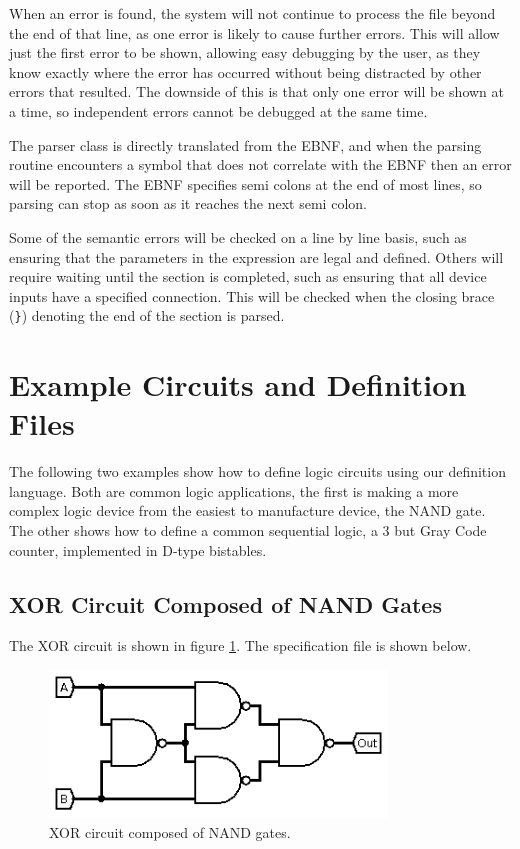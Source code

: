 \documentclass[a4paper,11pt]{article}  %
\begin{document}
When an error is found, the system will not continue to process the
file beyond the end of that line, as one error is likely to cause
further errors. This will allow just the first error to be shown,
allowing easy debugging by the user, as they know exactly where the
error has occurred without being distracted by other errors that
resulted. The downside of this is that only one error will be shown at
a time, so independent errors cannot be debugged at the same time. 

The parser class is directly translated from the EBNF, and when the
parsing routine encounters a symbol that does not correlate with the
EBNF then an error will be reported. The EBNF specifies
semi colons at the end of most lines, so parsing can stop as soon as
it reaches the next semi colon.

Some of the semantic errors will be checked on a line by line basis,
such as ensuring that the parameters in the expression are legal and
defined. Others will require waiting until the section is completed,
such as ensuring that all device inputs have a specified
connection. This will be checked when the closing brace (\verb+}+)
denoting the end of the section is parsed.

\section{Example Circuits and Definition Files}

The following two examples show how to define logic circuits using our
definition language. Both are common logic applications, the first is
making a more complex logic device from the easiest to manufacture
device, the NAND gate. The other shows how to define a common
sequential logic, a 3 but Gray Code counter, implemented in D-type
bistables.

\subsection{XOR Circuit Composed of NAND Gates}

The XOR circuit is shown in figure \ref{fig:xornand}. The
specification file is shown below.

\begin{figure}[!h]
  \begin{center}
    \includegraphics[width=0.8\textwidth]{XORfromNAND.png}
  \end{center}
  \caption{XOR circuit composed of NAND gates.}
  \label{fig:xornand}
\end{figure}
\end{document}
